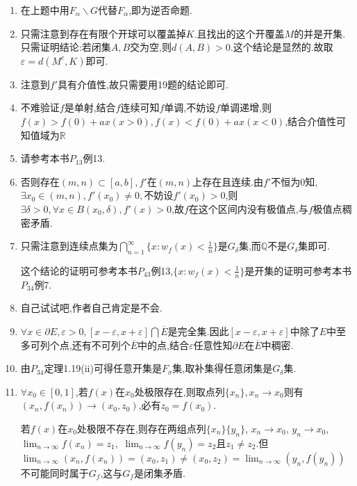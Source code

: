 \documentclass[UTF8, a4paper, 12pt, oneside, onecolumn]{article}
\numberwithin{equation}{section}
\numberwithin{figure}{section}
\numberwithin{table}{section}
\theoremstyle{nonumberplain}	%
\theoremstyle{plain}	%
\theoremstyle{plain}	%
\theoremstyle{plain}	%
\theoremstyle{plain}	%
\theoremstyle{nonumberplain}
\begin{document}
\begin{enumerate}
	
	\item 在上题中用$F_{\alpha}\backslash G$代替$F_{\alpha}$,即为逆否命题.
	
	
	\item 只需注意到存在有限个开球可以覆盖掉$K$.且找出的这个开覆盖$M$的并是开集.只需证明结论:若闭集$A,B$交为空,则$d(A,B)>0$.这个结论是显然的.故取$\varepsilon=d(M^c,K)$即可.
	
	\item 注意到$f'$具有介值性,故只需要用19题的结论即可.
	
	\item 不难验证$f$是单射,结合$f$连续可知$f$单调,不妨设$f$单调递增,则$f(x)>f(0)+ax(x>0),f(x)<f(0)+ax(x<0)$,结合介值性可知值域为$\mathbb{R}$
	
	\item 请参考本书$P_{13}$例13.
	
	\item 否则存在$(m,n)\subset[a,b],f'$在$(m,n)$上存在且连续.由$f'$不恒为0知,$\exists x_0\in (m,n),f'(x_0)\neq 0 ,$不妨设$f'(x_0)>0$,则$\exists \delta>0,\forall x\in B(x_0,\delta),f'(x)>0 $,故$f$在这个区间内没有极值点,与$f$极值点稠密矛盾.
	
	\item 只需注意到连续点集为$\displaystyle\bigcap_{n=1}^{\infty}\{x:w_f(x)<\frac{1}{n} \}$是$G_{\delta}$集,而$\mathbb{Q}$不是$G_{\delta}$集即可.
	
	这个结论的证明可参考本书$P_{43}$例13,$\{x:w_f(x)<\frac{1}{n} \}$是开集的证明可参考本书$P_{34}$例7.
	
	\item 自己试试吧,作者自己肯定是不会.
	
	\item $\forall x\in \partial E,\varepsilon>0,[x-\varepsilon,x+\varepsilon]\bigcap \overline{E}$是完全集.因此$[x-\varepsilon,x+\varepsilon]$中除了$E$中至多可列个点,还有不可列个$\overline{E}$中的点,结合$\varepsilon$任意性知$\partial E$在$\overline{E}$中稠密.
	
	\item 由$P_{34}$定理1.19(ii)可得任意开集是$F_{\sigma}$集,取补集得任意闭集是$G_{\delta}$集.
	
	\item
	$\forall x_0 \in [0,1]$,若$f(x)$在$x_0$处极限存在,则取点列$\{x_n\},x_n\rightarrow x_0$则有$(x_n,f(x_n))\rightarrow (x_0,z_0) $,必有$z_0=f(x_0)$.
	
	若$f(x)$在$x_0$处极限不存在,则存在两组点列$\displaystyle\{x_n\}\{y_n\}$, $x_n\rightarrow x_0$, $y_n\rightarrow x_0$, $\lim_{n\rightarrow \infty}f(x_n)=z_1,$
	$\displaystyle\lim_{n\rightarrow \infty}f(y_n)=z_2$且$z_1\neq z_2$.但$\displaystyle\lim_{n\rightarrow \infty}(x_n,f(x_n))= (x_0,z_1)\neq (x_0,z_2)=\lim_{n\rightarrow \infty}(y_n,f(y_n)) $不可能同时属于$G_f$,这与$G_f$是闭集矛盾.
	

\end{enumerate}
\end{document}
